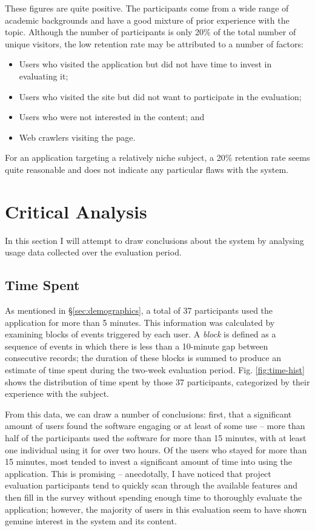 \documentclass[bsc,twoside,singlespacing,parskip,logo,notimes,normalheadings]{infthesis}
\begin{document}
    These figures are quite positive. The participants come from a
    wide range of academic backgrounds and have a good mixture of
    prior experience with the topic. Although the number of
    participants is only 20\% of the total number of unique visitors,
    the low retention rate may be attributed to a number of factors:

    \begin{itemize}
    \item Users who visited the application but did not have time to
      invest in evaluating it;
    \item Users who visited the site but did not want to participate
      in the evaluation;
    \item Users who were not interested in the content; and
    \item Web crawlers visiting the page.
    \end{itemize}

    For an application targeting a relatively niche subject, a 20\%
    retention rate seems quite reasonable and does not indicate any
    particular flaws with the system.

    \section{Critical Analysis}
    In this section I will attempt to draw conclusions about the
    system by analysing usage data collected over the evaluation
    period.

    \subsection{Time Spent}

    As mentioned in \S\ref{sec:demographics}, a total of 37
    participants used the application for more than 5 minutes. This
    information was calculated by examining blocks of events triggered
    by each user. A {\em block} is defined as a sequence of events in
    which there is less than a 10-minute gap between consecutive
    records; the duration of these blocks is summed to produce an
    estimate of time spent during the two-week evaluation
    period. Fig. \ref{fig:time-hist} shows the distribution of time
    spent by those 37 participants, categorized by their experience
    with the subject.

    From this data, we can draw a number of conclusions: first, that a
    significant amount of users found the software engaging or at
    least of some use -- more than half of the participants used the
    software for more than 15 minutes, with at least one individual
    using it for over two hours. Of the users who stayed for more than
    15 minutes, most tended to invest a significant amount of time
    into using the application. This is promising -- anecdotally, I
    have noticed that project evaluation participants tend to quickly
    scan through the available features and then fill in the survey
    without spending enough time to thoroughly evaluate the
    application; however, the majority of users in this evaluation
    seem to have shown genuine interest in the system and its content.
\end{document}
